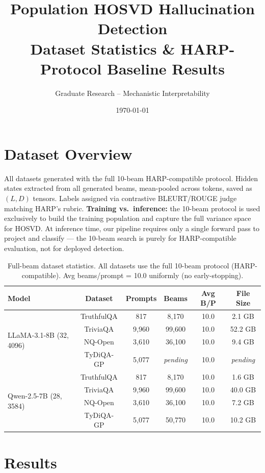 \documentclass[11pt,a4paper]{article}
\title{Population HOSVD Hallucination Detection\\
       \large Dataset Statistics \& HARP-Protocol Baseline Results}
\author{Graduate Research -- Mechanistic Interpretability}
\date{\today}
\begin{document}
\maketitle

\section{Dataset Overview}

All datasets generated with the full 10-beam HARP-compatible protocol.
Hidden states extracted from all generated beams, mean-pooled across tokens,
saved as $(L, D)$ tensors.  Labels assigned via contrastive BLEURT/ROUGE
judge matching HARP's rubric.  \textbf{Training vs.\ inference:} the 10-beam
protocol is used exclusively to build the training population and capture
the full variance space for HOSVD.  At inference time, our pipeline requires
only a single forward pass to project and classify --- the 10-beam search
is purely for HARP-compatible evaluation, not for deployed detection.

\begin{table}[h]
\centering
\begin{tabular}{lccccc}
\toprule
\textbf{Model} & \textbf{Dataset} & \textbf{Prompts} & \textbf{Beams} & \textbf{Avg B/P} & \textbf{File Size} \\
\midrule
\multirow{4}{*}{LLaMA-3.1-8B (32, 4096)}
  & TruthfulQA & 817   & 8,170   & 10.0 & 2.1 GB \\
  & TriviaQA   & 9,960 & 99,600  & 10.0 & 52.2 GB \\
  & NQ-Open    & 3,610 & 36,100  & 10.0 & 9.4 GB \\
  & TyDiQA-GP  & 5,077 & \textit{pending} & 10.0 & \textit{pending} \\
\midrule
\multirow{4}{*}{Qwen-2.5-7B (28, 3584)}
  & TruthfulQA & 817   & 8,170   & 10.0 & 1.6 GB \\
  & TriviaQA   & 9,960 & 99,600  & 10.0 & 40.0 GB \\
  & NQ-Open    & 3,610 & 36,100  & 10.0 & 7.2 GB \\
  & TyDiQA-GP  & 5,077 & 50,770  & 10.0 & 10.2 GB \\
\bottomrule
\end{tabular}
\caption{Full-beam dataset statistics.  All datasets use the full 10-beam
         protocol (HARP-compatible).  Avg beams/prompt = 10.0 uniformly
         (no early-stopping).}
\end{table}

\section{Results}
\end{document}
